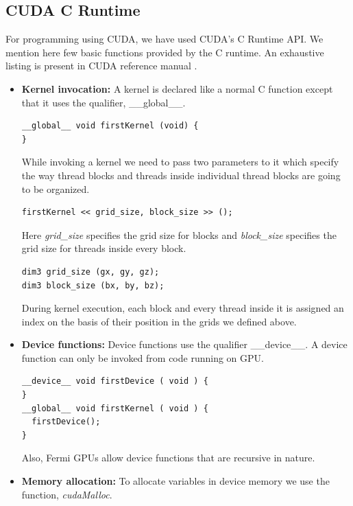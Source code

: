 \subsection{CUDA C Runtime}
For programming using CUDA, we have used CUDA's C Runtime API. We mention here few basic functions provided by the C runtime. An exhaustive listing is present in CUDA reference manual \cite{cuda}.
\begin{itemize}
\item {\bf Kernel invocation:} A kernel is declared like a normal C function except that it uses the qualifier, \_\_global\_\_.


\begin{lstlisting}
__global__ void firstKernel (void) {
}
\end{lstlisting}


While invoking a kernel we need to pass two parameters to it which specify the way thread blocks and threads inside individual thread blocks are going to be organized.

\begin{lstlisting}
firstKernel << grid_size, block_size >> ();
\end{lstlisting}

Here {\it grid\_size} specifies the grid size for blocks and {\it block\_size} specifies the grid size for threads inside every block.

\begin{lstlisting}
dim3 grid_size (gx, gy, gz);
dim3 block_size (bx, by, bz);
\end{lstlisting}

During kernel execution, each block and every thread inside it is assigned an index on the basis of their position in the grids we defined above.

\item {\bf Device functions:} Device functions use the qualifier \_\_device\_\_. A device function can only be invoked from code running on GPU.

\begin{lstlisting}
__device__ void firstDevice ( void ) {
}
__global__ void firstKernel ( void ) {
  firstDevice();
}
\end{lstlisting}

Also, Fermi GPUs allow device functions that are recursive in nature.


\item {\bf Memory allocation:} To allocate variables in device memory we use the function, {\it cudaMalloc}.


\end{itemize}
